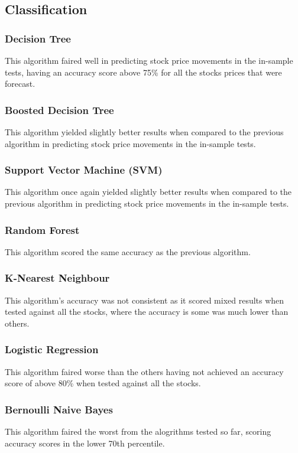 \subsection{Classification}

\subsubsection{Decision Tree}
This algorithm faired well in predicting stock price movements in the in-sample tests, having an accuracy score above 75\% for all the stocks prices that were forecast.

\subsubsection{Boosted Decision Tree}
This algorithm yielded slightly better results when compared to the previous algorithm in predicting stock price movements in the in-sample tests.

\subsubsection{Support Vector Machine (SVM)}
This algorithm once again yielded slightly better results when compared to the previous algorithm in predicting stock price movements in the in-sample tests.

\subsubsection{Random Forest}
This algorithm scored the same accuracy as the previous algorithm.

\subsubsection{K-Nearest Neighbour}
This algorithm's accuracy was not consistent as it scored mixed results when tested against all the stocks, where the accuracy is some was much lower than others. 

\subsubsection{Logistic Regression}
This algorithm faired worse than the others having not achieved an accuracy score of above 80\% when tested against all the stocks.

\subsubsection{Bernoulli Naive Bayes}
This algorithm faired the worst from the alogrithms tested so far, scoring accuracy scores in the lower 70th percentile.

